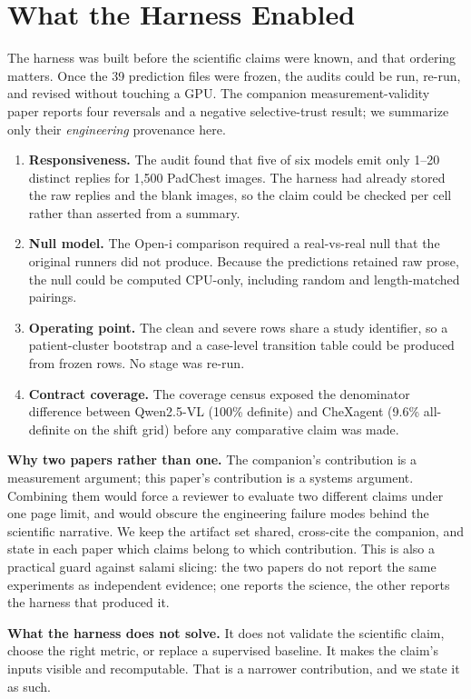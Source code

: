 \section{What the Harness Enabled}
\label{sec:enabled}

The harness was built before the scientific claims were known, and that ordering matters. Once the 39 prediction files were frozen, the audits could be run, re-run, and revised without touching a GPU. The companion measurement-validity paper reports four reversals and a negative selective-trust result; we summarize only their \emph{engineering} provenance here.

\begin{enumerate}[leftmargin=1.2em,itemsep=2pt,topsep=2pt]
\item \textbf{Responsiveness.} The audit found that five of six models emit only 1--20 distinct replies for 1,500 PadChest images. The harness had already stored the raw replies and the blank images, so the claim could be checked per cell rather than asserted from a summary.
\item \textbf{Null model.} The Open-i comparison required a real-vs-real null that the original runners did not produce. Because the predictions retained raw prose, the null could be computed CPU-only, including random and length-matched pairings.
\item \textbf{Operating point.} The clean and severe rows share a study identifier, so a patient-cluster bootstrap and a case-level transition table could be produced from frozen rows. No stage was re-run.
\item \textbf{Contract coverage.} The coverage census exposed the denominator difference between Qwen2.5-VL (100\% definite) and CheXagent (9.6\% all-definite on the shift grid) before any comparative claim was made.
\end{enumerate}

\textbf{Why two papers rather than one.} The companion's contribution is a measurement argument; this paper's contribution is a systems argument. Combining them would force a reviewer to evaluate two different claims under one page limit, and would obscure the engineering failure modes behind the scientific narrative. We keep the artifact set shared, cross-cite the companion, and state in each paper which claims belong to which contribution. This is also a practical guard against salami slicing: the two papers do not report the same experiments as independent evidence; one reports the science, the other reports the harness that produced it.

\textbf{What the harness does not solve.} It does not validate the scientific claim, choose the right metric, or replace a supervised baseline. It makes the claim's inputs visible and recomputable. That is a narrower contribution, and we state it as such.
